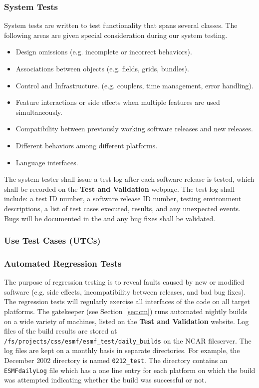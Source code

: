 \subsubsection{System Tests}

System tests are written to test functionality that spans several 
classes.  The following areas are given special
consideration during our system testing.

\begin{itemize}
\item Design omissions (e.g. incomplete or incorrect behaviors).
\item Associations between objects (e.g. fields, grids, bundles).
\item Control and Infrastructure. (e.g. couplers, time management, error handling).
\item Feature interactions or side effects when multiple features are used
simultaneously.
\item Compatibility between previously working software releases and new releases.
\item Different behaviors among different platforms.
\item Language interfaces.
\end{itemize}

The system tester shall issue a test log after each software release is tested,
which shall be recorded on the {\bf Test and Validation} webpage. The test 
log shall
include: a test ID number, a software release ID number, testing environment 
descriptions, a list of test cases executed, results, and any unexpected 
events. Bugs will be documented in the  and 
any bug fixes shall be validated.

\subsubsection{Use Test Cases (UTCs)}

\subsubsection{Automated Regression Tests}

The purpose of regression testing is to reveal faults caused by new
or modified software (e.g. side effects, incompatibility between 
releases, and bad bug fixes).  
The regression tests will regularly exercise all interfaces of the code on 
all target platforms.  The gatekeeper (see Section~\ref{sec:cm}) runs 
automated nightly builds on a wide variety of machines, listed on the
{\bf Test and Validation} website. 
Log files of the build results are stored at {\tt /fs/projects/css/esmf/esmf\_test/daily\_builds} on the NCAR fileserver. 
The log files are kept on a monthly basis in 
separate directories. For example, the December 2002 directory is named {\tt 0212\_test}. The 
directory contains an {\tt ESMFdailyLog} file which has a one line entry for each platform on 
which the build was attempted indicating whether the build was successful or not. 

